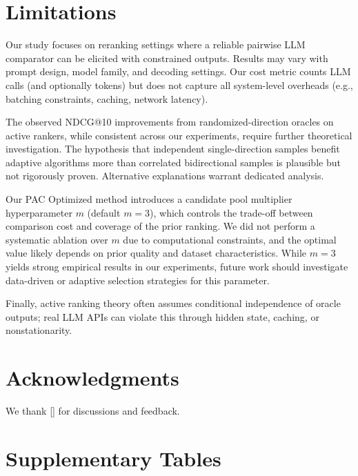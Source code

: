 \documentclass[11pt]{article}
\begin{document}
\section*{Limitations}

Our study focuses on reranking settings where a reliable pairwise LLM comparator can be elicited with constrained outputs. Results may vary with prompt design, model family, and decoding settings. Our cost metric counts LLM calls (and optionally tokens) but does not capture all system-level overheads (e.g., batching constraints, caching, network latency).

The observed NDCG@10 improvements from randomized-direction oracles on active rankers, while consistent across our experiments, require further theoretical investigation. The hypothesis that independent single-direction samples benefit adaptive algorithms more than correlated bidirectional samples is plausible but not rigorously proven. Alternative explanations warrant dedicated analysis.

Our PAC Optimized method introduces a candidate pool multiplier hyperparameter $m$ (default $m=3$), which controls the trade-off between comparison cost and coverage of the prior ranking. We did not perform a systematic ablation over $m$ due to computational constraints, and the optimal value likely depends on prior quality and dataset characteristics. While $m=3$ yields strong empirical results in our experiments, future work should investigate data-driven or adaptive selection strategies for this parameter.

Finally, active ranking theory often assumes conditional independence of oracle outputs; real LLM APIs can violate this through hidden state, caching, or nonstationarity.


\section*{Acknowledgments}
We thank [\;] for discussions and feedback.

\clearpage
\FloatBarrier





\clearpage
\onecolumn        %
\appendix

\section{Supplementary Tables}
\label{sec:appendix}
\FloatBarrier
\end{document}
